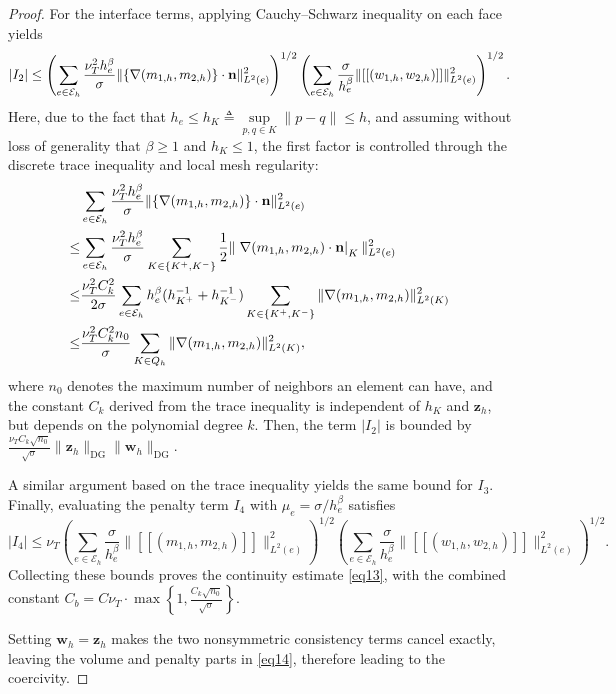 \documentclass[pdflatex,sn-mathphys-num]{sn-jnl}%
\theoremstyle{thmstyleone}%
\theoremstyle{thmstyletwo}%
\theoremstyle{thmstylethree}%
\begin{document}
\begin{proof}
For the interface terms, applying Cauchy--Schwarz inequality on each face yields
\begin{equation}\notag
|I_2|
\le
\left(
\sum_{e\in \mathcal{E}_h}\frac{\nu_T^2h_e^\beta}{\sigma}\|\{\nabla (m_{1,h},m_{2,h})\}\cdot \mathbf{n}\|_{L^2(e)}^2
\right)^{1/2}
\left(
\sum_{e\in \mathcal{E}_h}\frac{\sigma}{h_e^\beta}\|[[ (w_{1,h},w_{2,h})]]\|_{L^2(e)}^2
\right)^{1/2}.
\end{equation}
Here, due to the fact that $h_e \le h_K \triangleq \sup\limits_{p, q \in K}\|p-q\| \le h$, and assuming without loss of generality that $\beta \ge 1$ and $h_K \le 1$, the first factor is controlled through the discrete trace inequality and local mesh regularity:
\begin{equation}\notag
\begin{aligned}
&\sum_{e\in \mathcal{E}_h}\frac{\nu_T^2h_e^\beta}{\sigma}\|\{\nabla (m_{1,h},m_{2,h})\}\cdot \mathbf{n}\|_{L^2(e)}^2\\
\le& \sum_{e \in \mathcal{E}_h} \frac{\nu_T^2h_e^\beta}{\sigma}\sum_{K \in \{K^+,K^-\}}\frac{1}{2} \| \left.\nabla (m_{1,h},m_{2,h})\cdot \mathbf{n} \right|_{K}\|_{L^2(e)}^2  \\
\le& \frac{\nu_T^2C_k^2}{2\sigma}\sum_{e \in \mathcal{E}_h} h_e^\beta (h_{K^+}^{-1} + h_{K^-}^{-1}) \sum_{K \in \{K^+,K^-\}} \|\nabla (m_{1,h},m_{2,h})\|_{L^2(K)}^2 \\
\le& 
\frac{\nu_T^2C_k^2 n_0}{\sigma} \sum_{K\in Q_h} \|\nabla (m_{1,h},m_{2,h})\|_{L^2(K)}^2,
\end{aligned}
\end{equation}
where $n_0$ denotes the maximum number of neighbors an element can have, and the constant $C_k$ derived from the trace inequality is independent of $h_K$ and $\mathbf{z}_h$, but depends on the polynomial degree $k$. Then, the term $|I_2|$ is bounded by $\frac{\nu_T C_k \sqrt{n_0}}{\sqrt{\sigma}}\|\mathbf{z}_h\|_{\mathrm{DG}}\|\mathbf{w}_h\|_{\mathrm{DG}}$.

A similar argument based on the trace inequality yields the same bound for $I_3$. Finally, evaluating the penalty term $I_4$ with $\mu_e = \sigma/h_e^\beta$ satisfies
\[
|I_4|
\le \nu_T
\left(
\sum_{e\in \mathcal{E}_h}\frac{\sigma}{h_e^\beta}
\|[[(m_{1,h},m_{2,h})]]\|_{L^2(e)}^2
\right)^{1/2}
\left(
\sum_{e \in \mathcal{E}_h}\frac{\sigma}{h_e^\beta}
\|[[(w_{1,h},w_{2,h})]]\|_{L^2(e)}^2
\right)^{1/2}.
\]
Collecting these bounds proves the continuity estimate \eqref{eq13}, with the combined constant $C_b=C \nu_T \cdot \max \left\{1,\frac{C_k \sqrt{n_0}}{\sqrt{\sigma}}\right\}$.

Setting $\mathbf w_h=\mathbf z_h$ makes the two nonsymmetric consistency terms cancel exactly, leaving the volume and penalty parts in \eqref{eq14},
therefore leading to the coercivity.
\end{proof}
\end{document}
